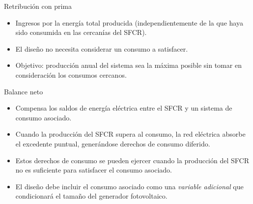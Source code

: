 \documentclass[xcolor={usenames,svgnames,dvipsnames}]{beamer}
\begin{document}
\begin{frame}[label=sec-1-2-2]{Retribución con prima}
\begin{itemize}
\item \alert{Ingresos} por la \alert{energía total producida} (independientemente de la que
haya sido consumida en las cercanías del SFCR).

\item El diseño \alert{no necesita considerar un consumo} a satisfacer.

\item \alert{Objetivo}: producción anual del sistema sea la máxima posible sin
tomar en consideración los consumos cercanos.
\end{itemize}
\end{frame}

\begin{frame}[label=sec-1-2-3]{Balance neto}
\begin{itemize}
\item \alert{Compensa los saldos de energía eléctrica} entre el SFCR y un sistema de consumo asociado.

\item Cuando la producción del SFCR supera al consumo, la red eléctrica absorbe el excedente puntual, generándose derechos de consumo diferido.

\item Estos derechos de consumo se pueden ejercer cuando la producción del SFCR no es suficiente para satisfacer el consumo asociado.

\item El \alert{diseño debe incluir el consumo asociado} como una \emph{variable adicional} que condicionará el tamaño del generador fotovoltaico.
\end{itemize}
\end{frame}
\end{document}
